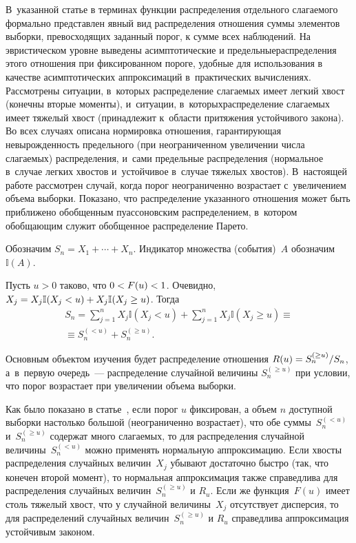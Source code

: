 \begin{multicols}{2}
В~указанной 
статье в терминах функции распределения отдельного слагаемого формально 
пред\-став\-лен явный вид распределения отношения суммы элементов выборки, 
превосходящих заданный порог, к сумме всех наблюдений. На эвристическом 
уровне выведены асимптотические и предельные\linebreak распределения этого отношения 
при фиксированном пороге, удобные для использования в качестве 
асимптотических аппроксимаций в~практических вычислениях. Рассмотрены 
ситуации, в~\mbox{которых} распределение слагаемых имеет легкий хвост (конечны 
вторые моменты), и~ситуации, в~которых\linebreak распределение слагаемых имеет тяжелый 
хвост (принадлежит к~об\-ласти притяжения устойчивого закона). Во всех случаях 
описана нормировка отношения, гарантирующая невырожденность предельного (при 
неограниченном увеличении числа слагаемых) распределения, и~сами предельные 
распределения (нормальное в~случае легких хвостов и~устойчивое в~случае 
тяжелых хвостов). В~на\-сто\-ящей работе рас\-смот\-рен случай, когда порог 
неограниченно возрастает с~увеличением объема выборки. Показано, что 
распределение указанного отношения может быть приближено обобщенным 
пуассоновским распределением, в~котором обобщающим служит обобщенное 
распределение Па\-рето.

Обозначим $S_n=X_1+\cdots+X_n$. Индикатор множества (события)~$A$
обозначим~$\mathbb{I}(A)$.

Пусть $u>0$ таково, что $0\hm<F(u)\hm<1$. Очевидно, 
$X_j\hm=X_j\mathbb{I}(X_j\hm<u)\hm+X_j\mathbb{I}(X_j\hm\ge u)$. Тогда
\begin{multline*}
S_n=\sum\limits_{j=1}^n X_j\mathbb{I}(X_j<u)+\sum\limits_{j=1}^n 
X_j\mathbb{I}(X_j\ge u)\equiv{}\\
{}\equiv
S_n^{(<u)}+S_n^{(\ge u)}.
\end{multline*}

Основным объектом изучения будет распределение отношения $R(u)\hm=S_n^{(\ge 
u)}/S_n$, а~в~первую очередь~--- распределение случайной величины $S_n^{(\ge 
u)}$ при условии, что порог возрастает при увеличении объема выборки.

Как было показано в статье~\cite{Korolev2020}, если порог $u$ фиксирован, а 
объем $n$ доступной выборки настолько большой (неограниченно возрастает), что 
обе суммы~$S_n^{(< u)}$ и~$S_n^{(\ge u)}$ содержат много слагаемых, то для
распределения случайной величины~$S_n^{(< u)}$ можно применять
нормальную аппроксимацию. Если хвосты распределения случайных
величин~$X_j$ убывают достаточно быстро (так, что конечен второй
момент), то нормальная аппроксимация также справедлива для распределения
случайных величин~$S_n^{(\ge u)}$ и $R_u$. Если же функция~$F(u)$ имеет столь
тяжелый хвост, что у случайной величины~$X_j$ отсутствует дисперсия, то для
распределений случайных величин~$S_n^{(\ge u)}$ и $R_u$ справедлива
аппроксимация устойчивым законом.


\end{multicols}
